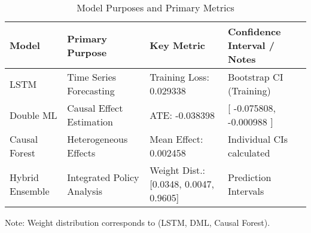 \begin{table}[htbp]
  \centering
  \caption{Model Purposes and Primary Metrics}
  \label{tab:model_performance}
  \small
  \begin{tabular}{llll}
    \toprule
    Model & Primary Purpose & Key Metric & Confidence Interval / Notes \\
    \midrule
    LSTM & Time Series Forecasting & Training Loss: 0.029338 & Bootstrap CI (Training) \\
    Double ML & Causal Effect Estimation & ATE: -0.038398 & [ -0.075808, -0.000988 ] \\
    Causal Forest & Heterogeneous Effects & Mean Effect: 0.002458 & Individual CIs calculated \\
    Hybrid Ensemble & Integrated Policy Analysis & Weight Dist.: [0.0348, 0.0047, 0.9605] & Prediction Intervals \\
    \bottomrule
  \end{tabular}
  \vspace{0.5em}
  {\footnotesize Note: Weight distribution corresponds to (LSTM, DML, Causal Forest).}
\end{table}
